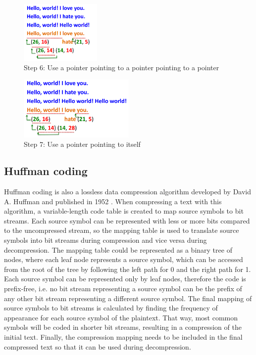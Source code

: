 \begin{figure}[H] \caption{Step 6: Use a pointer pointing to a pointer pointing
to a pointer} \centering
\includegraphics[width=0.35\textwidth]{diagrams/lz77_6.png}\end{figure}
\begin{figure}[H] \caption{Step 7: Use a pointer pointing to itself} \centering
\includegraphics[width=0.5\textwidth]{diagrams/lz77_7.png}\end{figure}

\subsection{Huffman coding}\label{subsec:huffman}

Huffman coding is also a lossless data compression algorithm developed by David
A. Huffman and published in 1952 \cite{huffman}. When compressing a text with
this algorithm, a variable-length code table is created to map source symbols to
bit streams. Each source symbol can be represented with less or more bits
compared to the uncompressed stream, so the mapping table is used to translate
source symbols into bit streams during compression and vice versa during
decompression. The mapping table could be represented as a binary tree of nodes,
where each leaf node represents a source symbol, which can be accessed from the
root of the tree by following the left path for 0 and the right path for 1. Each
source symbol can be represented only by leaf nodes, therefore the code is
prefix-free, i.e. no bit stream representing a source symbol can be the prefix
of any other bit stream representing a different source symbol. The final
mapping of source symbols to bit streams is calculated by finding the frequency
of appearance for each source symbol of the plaintext. That way, most common
symbols will be coded in shorter bit streams, resulting in a compression of the
initial text. Finally, the compression mapping needs to be included in the final
compressed text so that it can be used during decompression.

